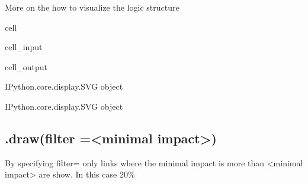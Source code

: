 \documentclass[letterpaper,10pt,english]{jupyterBook}
\begin{document}
\sphinxAtStartPar
More on the how to visualize the logic structure 

\begin{sphinxuseclass}{cell}\begin{sphinxVerbatimInput}

\begin{sphinxuseclass}{cell_input}
\begin{sphinxVerbatim}[commandchars=\\\{\}]
\PYG{p}{[}\PYG{p}{]}  
\end{sphinxVerbatim}

\end{sphinxuseclass}\end{sphinxVerbatimInput}
\begin{sphinxVerbatimOutput}

\begin{sphinxuseclass}{cell_output}
\begin{sphinxVerbatim}[commandchars=\\\{\}]
\PYGZlt{}IPython.core.display.SVG object\PYGZgt{}
\end{sphinxVerbatim}

\begin{sphinxVerbatim}[commandchars=\\\{\}]
\PYGZlt{}IPython.core.display.SVG object\PYGZgt{}
\end{sphinxVerbatim}

\end{sphinxuseclass}\end{sphinxVerbatimOutput}

\end{sphinxuseclass}

\subsection{.draw(filter =<minimal impact>)}
\label{\detokenize{content/notebooks/modelflow_features:draw-filter-minimal-impact}}
\sphinxAtStartPar
By specifying filter=  only links where the minimal impact is more than <minimal impact> are show. In this case 20\%
\end{document}
